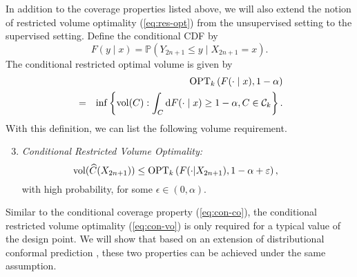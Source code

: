 In addition to the coverage properties listed above, we will also extend the notion of restricted volume optimality (\ref{eq:res-opt}) from the unsupervised setting to the supervised setting. Define the conditional CDF by
$$F(y\mid x)=\mathbb{P}\left(Y_{2n+1}\leq y \mid X_{2n+1}=x\right).$$
The conditional restricted optimal volume is given by
\begin{eqnarray}
\nonumber && \operatorname{OPT}_k\left(F(\cdot\mid x),1-\alpha\right) \\
\nonumber  &=& \inf\left\{\mathrm{vol}(C): \int_C\mathrm{d} F(\cdot\mid x)\geq 1-\alpha, C\in\mathcal{C}_k\right\}.
\end{eqnarray}
With this definition, we can list the following volume requirement.
\begin{enumerate}
  \setcounter{enumi}{2}
  \item \textit{Conditional Restricted Volume Optimality:}
\begin{equation}
\hspace{-2.5em}
\vol(\widehat{C}(X_{2n+1}))\leq \opt_k\left(F(\cdot|X_{2n+1}),1-\alpha+\epsilon\right), \label{eq:con-vo}
\end{equation}
with high probability, for some $\epsilon\in(0,\alpha)$.
\end{enumerate}
Similar to the conditional coverage property (\ref{eq:con-co}), the conditional restricted volume optimality (\ref{eq:con-vo}) is only required for a typical value of the design point. We will show that based on an extension of distributional conformal prediction \citep{chernozhukov2021distributional}, these two properties can be achieved under the same assumption.



